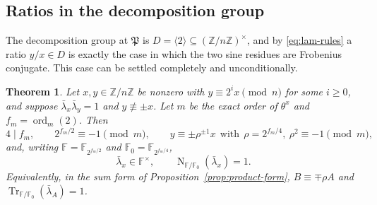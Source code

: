 \documentclass[a4paper]{article}
\newtheorem{theorem}{Theorem}[section]
\newcommand{\F}{\mathbb{F}}
\newcommand{\Z}{\mathbb{Z}}
\newcommand{\ord}[2][]{\operatorname{ord}_{#1}\!\left(#2\right)}
\DeclareMathOperator{\Tr}{Tr}
\DeclareMathOperator{\Nm}{N}
\begin{document}
\subsection{Ratios in the decomposition group}

The decomposition group at $\mathfrak P$ is $D=\langle2\rangle\subseteq
(\Z/n\Z)^{\times}$, and by \eqref{eq:lam-rules} a ratio $y/x\in D$ is
exactly the case in which the two sine residues are Frobenius conjugate.
This case can be settled completely and unconditionally.

\begin{theorem}\label{thm:frobratio}
	Let $x,y\in\Z/n\Z$ be nonzero with $y\equiv2^{i}x\pmod n$ for some
	$i\geq0$, and suppose $\bar\lambda_x\bar\lambda_y=1$ and
	$y\not\equiv\pm x$.
	Let $m$ be the exact order of $\theta^{x}$ and $f_m=\ord[m]{2}$.
	Then
	\[
		4\mid f_m,
		\qquad
		2^{f_m/2}\equiv-1\pmod m,
		\qquad
		y\equiv\pm\rho^{\pm1}x\ \ \text{with}\ \ \rho=2^{f_m/4},
		\ \rho^{2}\equiv-1\pmod m ,
	\]
	and, writing $\F=\F_{2^{f_m/2}}$ and $\F_0=\F_{2^{f_m/4}}$,
	\[
		\bar\lambda_x\in\F^{\times},
		\qquad
		\Nm_{\F/\F_0}\!\left(\bar\lambda_x\right)=1 .
	\]
	Equivalently, in the sum form of Proposition~\ref{prop:product-form},
	$B\equiv\mp\rho A$ and $\Tr_{\F/\F_0}(\bar\lambda_A)=1$.
\end{theorem}
\end{document}

